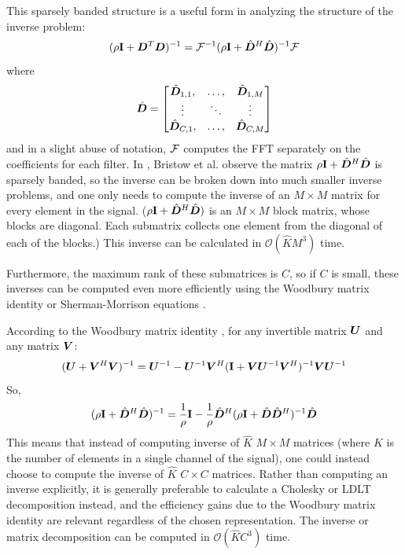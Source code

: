 This sparsely banded structure is a useful form in analyzing the structure of the inverse problem:
\begin{equation}
(\rho {\bf I} + \bm{D}^T\bm{D})^{-1} = \mathcal{F}^{-1}(\rho{\bf I} + \hat{\bm{D}}^H\hat{\bm{D}})^{-1}\mathcal{F}
\end{equation}
%
where
\begin{equation}
\hat{\bm{D}} = \begin{bmatrix}
\hat{\bm{D}}_{1,1}, & \hdots, & \hat{\bm{D}}_{1,M}\\
\vdots & \ddots & \vdots\\
\hat{\bm{D}}_{C,1}, & \hdots, & \hat{\bm{D}}_{C,M}
\end{bmatrix}
\end{equation}
%
and in a slight abuse of notation, $\mathcal{F}$ computes the FFT separately on the coefficients for each filter.  In \cite{Bristow2013fast}, Bristow et al. observe the matrix $\rho{\bf I} + \hat{\bm{D}}^H\hat{\bm{D}}$ is sparsely banded, so the inverse can be broken down into much smaller inverse problems, and one only needs to compute the inverse of an $M \times M$ matrix for every element in the signal. ($\rho{\bf I} + \hat{\bm{D}}^H\hat{\bm{D}})$ is an $M \times M$ block matrix, whose blocks are diagonal.  Each submatrix collects one element from the diagonal of each of the blocks.) This inverse can be calculated in $\mathcal{O}(\hat{K}M^3)$ time.

Furthermore, the maximum rank of these submatrices is $C$, so if $C$ is small, these inverses can be computed even more efficiently using the Woodbury matrix identity or Sherman-Morrison equations \cite{vsorel2016fast} \cite{heide2015fast} \cite{wohlberg2015efficient}.

According to the Woodbury matrix identity \cite{henderson1981deriving}, for any invertible matrix $\bm{U}$ and any matrix $\bm{V}$:
\begin{equation}
(\bm{U} + \bm{V}^H\bm{V})^{-1} = \bm{U}^{-1} - \bm{U}^{-1}\bm{V}^H({\bf I} + \bm{V}\bm{U}^{-1}\bm{V}^H)^{-1}\bm{V}\bm{U}^{-1}
\end{equation}
%
So,
\begin{equation}
(\rho{\bf I} + \hat{\bm{D}}^H\hat{\bm{D}})^{-1} = \frac{1}{\rho}{\bf I} - \frac{1}{\rho}\hat{\bm{D}}^H(\rho{\bf I} + \hat{\bm{D}}\hat{\bm{D}}^H)^{-1}\hat{\bm{D}}
\end{equation}
%
This means that instead of computing inverse of $\hat{K}$ $M \times M$ matrices (where $K$ is the number of elements in a single channel of the signal), one could instead choose to compute the inverse of $\hat{K}$ $C \times C$ matrices. Rather than computing an inverse explicitly, it is generally preferable to calculate a Cholesky or LDLT decomposition instead, and the efficiency gains due to the Woodbury matrix identity are relevant regardless of the chosen representation. The inverse or matrix decomposition can be computed in $\mathcal{O}(\hat{K}C^3)$ time.

